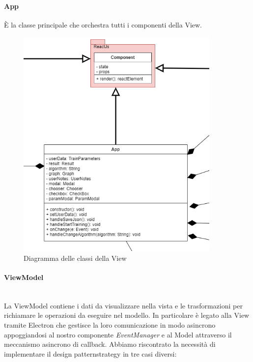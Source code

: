 		\paragraph*{App}
		È la classe principale che orchestra tutti i componenti della View.
		\mbox{}
				\begin{figure} [H]
					\begin{center}
						\includegraphics[width=100mm]{img/Diagrammi/view-app.png}
					\end{center}
					\caption{Diagramma delle classi della View}
				\end{figure}
	
		\paragraph{ViewModel} \mbox{} \\[1mm]
		La ViewModel contiene i dati da visualizzare nella vista e le trasformazioni per richiamare le operazioni da eseguire nel modello.
		In particolare è legato alla View tramite Electron che gestisce la loro comunicazione in modo asincrono appoggiandosi al nostro componente \textit{EventManager} e al Model attraverso il meccanismo asincrono di callback.
		Abbiamo riscontrato la necessità di implementare il design pattern\glosp strategy in tre casi diversi:
